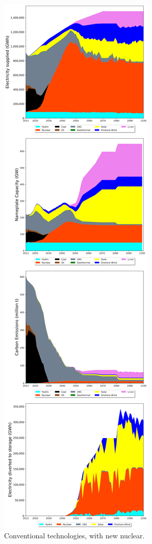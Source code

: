 \begin{figure}[h] 
\centering
\label{scen2}
\includegraphics[scale=0.2]{figures/conv_nuc}
\caption{Conventional technologies, with new nuclear.}
\end{figure}

